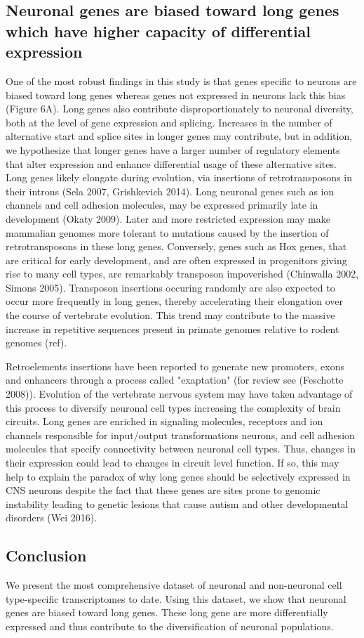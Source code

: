 \subsection{Neuronal genes are biased toward long genes which have higher capacity of differential expression}
One of the most robust findings in this study is that genes specific to neurons are biased toward long genes whereas genes not expressed in neurons lack this bias (Figure 6A). Long genes also contribute disproportionately to neuronal diversity, both at the level of gene expression and splicing. Increases in the number of alternative start and splice sites in longer genes may contribute, but in addition, we hypothesize that longer genes have a larger number of regulatory elements that alter expression and enhance differential usage of these alternative sites. Long genes likely elongate during evolution, via insertions of retrotransposons in their introns (Sela 2007, Grishkevich 2014). Long neuronal genes such as ion channels and cell adhesion molecules, may be expressed primarily late in development (Okaty 2009). Later and more restricted expression may make mammalian genomes more tolerant to mutations caused by the insertion of retrotransposons in these long genes. Conversely, genes such as Hox genes, that are critical for early development, and are often expressed in progenitors giving rise to many cell types, are remarkably transposon impoverished (Chinwalla 2002, Simons 2005). Transposon insertions occuring randomly are also expected to occur more frequently in long genes, thereby accelerating their elongation over the course of vertebrate evolution. This trend may contribute to the massive increase in repetitive sequences present in primate genomes relative to rodent genomes (ref).

Retroelements insertions have been reported to generate new promoters, exons and enhancers through a process called "exaptation" (for review see (Feschotte 2008)). Evolution of the vertebrate nervous system may have taken advantage of this process to diversify neuronal cell types increasing the complexity of brain circuits. Long genes are enriched in signaling molecules, receptors and ion channels responsible for input/output transformations neurons, and cell adhesion molecules that specify connectivity between neuronal cell types. Thus, changes in their expression could lead to changes in circuit level function. If so, this may help to explain the paradox of why long genes should be selectively expressed in CNS neurons despite the fact that these genes are sites prone to genomic instability leading to genetic lesions that cause autism and other developmental disorders (Wei 2016).

\subsection{Conclusion}
We present the most comprehensive dataset of neuronal and non-neuronal cell type-specific transcriptomes to date. Using this dataset, we show that neuronal genes are biased toward long genes. These long gene are more differentially expressed and thus contribute to the diversification of neuronal populations.
